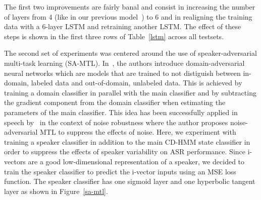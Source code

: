 \documentclass[a4paper]{article}
\begin{document}
The first two improvements are fairly banal and consist in increasing
the number of layers from 4 (like in our previous model~\cite{saon16})
to 6 and in realigning the training data with a 6-layer LSTM and
retraining another LSTM. The effect of these steps is shown in the
first three rows of Table~\ref{lstm} across all testsets.

\begin{table}[htpb!]
\begin{center}
\end{center}
\caption{\label{lstm}
Word error rates for LSTM AMs across all testsets (36M n-gram LM).}
\end{table}

The second set of experiments was centered around the use of
speaker-adversarial multi-task learning (SA-MTL). In~\cite{ganin16},
the authors introduce domain-adversarial neural networks which are
models that are trained to not distiguish between in-domain, labeled
data and out-of-domain, unlabeled data. This is achieved by training a
domain classifier in parallel with the main classifier and by
subtracting the gradient component from the domain classifier when
estimating the parameters of the main classifier. This idea has been
successfully applied in speech by~\cite{shinohara16} in the context of noise
robustness where the author proposes noise-adversarial MTL to suppress
the effects of noise. Here, we experiment with training a speaker
classifier in addition to the main CD-HMM state classifier in order to
suppress the effects of speaker variability on ASR performance. Since
i-vectors are a good low-dimensional representation of a speaker, we
decided to train the speaker classifier to predict the i-vector inputs
using an MSE loss function. The speaker classifier has one sigmoid
layer and one hyperbolic tangent layer as shown in
Figure~\ref{sa-mtl}.
\end{document}
